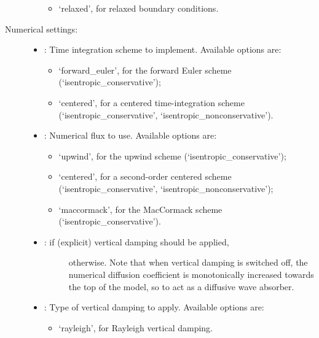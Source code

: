 \documentclass[letterpaper,10pt,english]{sphinxmanual}
\begin{document}
\begin{description}
\begin{itemize}
\begin{itemize}
\item {} 
‘relaxed’, for relaxed boundary conditions.

\end{itemize}

\end{itemize}

\item[{Numerical settings:}] \leavevmode\begin{itemize}
\item {} 
: Time integration scheme to implement. Available options are:
\begin{itemize}
\item {} 
‘forward\_euler’, for the forward Euler scheme (‘isentropic\_conservative’);

\item {} 
‘centered’, for a centered time-integration scheme (‘isentropic\_conservative’, ‘isentropic\_nonconservative’).

\end{itemize}

\item {} 
: Numerical flux to use. Available options are:
\begin{itemize}
\item {} 
‘upwind’, for the upwind scheme (‘isentropic\_conservative’);

\item {} 
‘centered’, for a second-order centered scheme (‘isentropic\_conservative’, ‘isentropic\_nonconservative’);

\item {} 
‘maccormack’, for the MacCormack scheme (‘isentropic\_conservative’).

\end{itemize}

\item {} \begin{description}
\item[{:  if (explicit) vertical damping should be applied,}] \leavevmode
{} otherwise. Note that when vertical damping is switched off, the numerical diffusion               coefficient is monotonically increased towards the top of the model, so to act as a diffusive wave absorber.

\end{description}

\item {} 
: Type of vertical damping to apply. Available options are:
\begin{itemize}
\item {} 
‘rayleigh’, for Rayleigh vertical damping.


\end{itemize}
\end{itemize}
\end{description}
\end{document}
